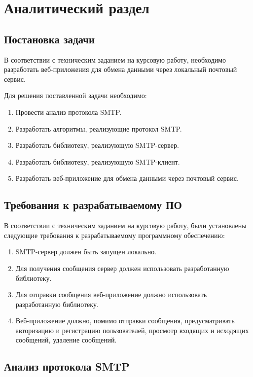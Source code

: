\chapter{Аналитический раздел}

\section{Постановка задачи}

В соответствии с техническим заданием на курсовую работу, необходимо разработать веб-приложения для обмена данными через локальный почтовый сервис.

Для решения поставленной задачи необходимо:
\begin{enumerate}
	\item Провести анализ протокола SMTP.
	\item Разработать алгоритмы, реализующие протокол SMTP.
	\item Разработать библиотеку, реализующую SMTP-сервер.
	\item Разработать библиотеку, реализующую SMTP-клиент.
	\item Разработать веб-приложение для обмена данными через почтовый сервис.
\end{enumerate}

\section{Требования к разрабатываемому ПО}

В соответствии с техническим заданием на курсовую работу, были установлены следующие требования к разрабатываемому программному обеспечению:
\begin{enumerate}
	\item SMTP-сервер должен быть запущен локально.
	\item Для получения сообщения сервер должен использовать разработанную библиотеку.
	\item Для отправки сообщения веб-приложение должно использовать разработанную библиотеку.
	\item Веб-приложение должно, помимо отправки сообщения, предусматривать авторизацию и регистрацию пользователей, просмотр входящих и исходящих сообщений, удаление сообщений.
\end{enumerate}

\section{Анализ протокола SMTP}

